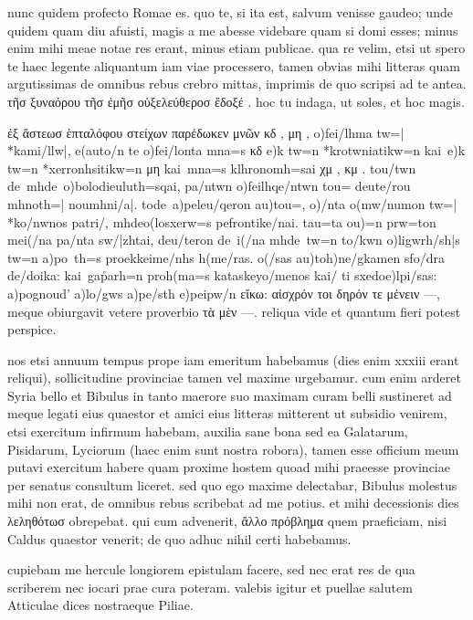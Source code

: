 


 nunc quidem profecto Romae es. quo te, si ita est, salvum venisse gaudeo; unde quidem quam diu afuisti, magis a me abesse videbare quam si domi esses; minus enim mihi meae notae res erant, minus etiam publicae. qua re velim, etsi ut spero te haec legente aliquantum iam viae processero, tamen obvias mihi litteras quam argutissimas de omnibus rebus crebro mittas, imprimis de quo scripsi ad te antea. τῆσ ξυναόρου τῆσ ἐμῆσ οὑξελεύθεροσ ἔδοξέ . hoc tu indaga, ut soles, et hoc magis.

 ἐξ ἄστεωσ ἑπταλόφου στείχων παρέδωκεν μνῶν κδ , μη , o)fei/lhma tw=| *kami/llw|, e(auto/n te o)fei/lonta mna=s κδ e)k tw=n *krotwniatikw=n kai\ e)k tw=n *xerronhsitikw=n μη kai\ mna=s klhronomh=sai χμ , κμ . tou/twn de\ mhde\ o)bolo\n dieuluth=sqai, pa/ntwn o)feilhqe/ntwn tou= deute/rou mhno\s th=| noumhni/a|. to\n de\ a)peleu/qeron au)tou=, o)/nta o(mw/numon tw=| *ko/nwnos patri/, mhde\n o(losxerw=s pefrontike/nai. tau=ta ou)=n prw=ton me\n i(/na pa/nta sw/|zhtai, deu/teron de\ i(/na mhde\ tw=n to/kwn o)ligwrh/sh|s tw=n a)po\ th=s proekkeime/nhs h(me/ras. o(/sas au)to\n h)ne/gkamen sfo/dra de/doika: kai\ ga\r parh=n pro\s h(ma=s kataskeyo/menos kai/ ti sxedo\n e)lpi/sas: a)pognou\s d' a)lo/gws a)pe/sth e)peipw/n εἴκω: αἰσχρόν τοι δηρόν τε μένειν —, meque obiurgavit vetere proverbio τὰ μὲν —. reliqua vide et quantum fieri potest perspice.

 nos etsi annuum tempus prope iam emeritum habebamus (dies enim xxxiii erant reliqui), sollicitudine provinciae tamen vel maxime urgebamur. cum enim arderet Syria bello et Bibulus in tanto maerore suo maximam curam belli sustineret ad meque legati eius quaestor et amici eius litteras mitterent ut subsidio venirem, etsi exercitum infirmum habebam, auxilia sane bona sed ea Galatarum, Pisidarum, Lyciorum (haec enim sunt nostra robora), tamen esse officium meum putavi exercitum habere quam proxime hostem quoad mihi praeesse provinciae per senatus consultum liceret. sed quo ego maxime delectabar, Bibulus molestus mihi non erat, de omnibus rebus scribebat ad me potius. et mihi decessionis dies λεληθότωσ obrepebat. qui cum advenerit, ἄλλο πρόβλημα quem praeficiam, nisi Caldus quaestor venerit; de quo adhuc nihil certi habebamus.

 cupiebam me hercule longiorem epistulam facere, sed nec erat res de qua scriberem nec iocari prae cura poteram. valebis igitur et puellae salutem Atticulae dices nostraeque Piliae.
